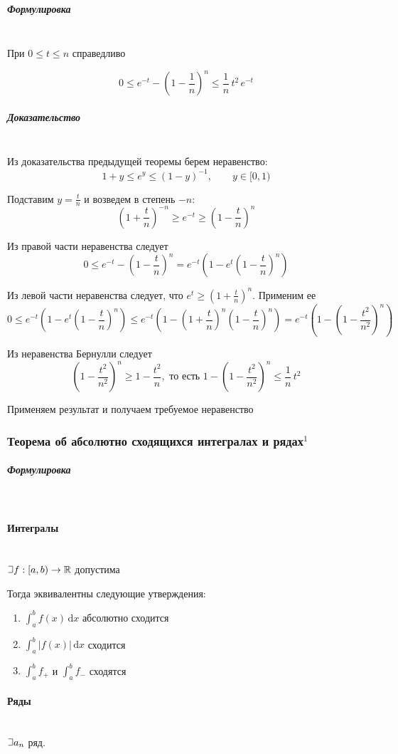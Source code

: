 \documentclass{article}
\def\letus{%
\mathord{\setbox0=\hbox{$\exists$}%
         \hbox{\kern 0.125\wd0%
               \vbox to \ht0{%
                  \hrule width 0.75\wd0%
                  \vfill%
                  \hrule width 0.75\wd0}%
               \vrule height \ht0%
               \kern 0.125\wd0}%
       }%
        }
\def\D{\,\mathrm{d}}
\let\vanillaparagraph\paragraph
\let\vanillasubparagraph\subparagraph
\renewcommand{\paragraph}[1]{\vanillaparagraph{#1}\mbox{}\\}
\renewcommand{\subparagraph}[1]{\vanillasubparagraph{#1}\mbox{}\\}
\begin{document}
\subparagraph{Формулировка}
При $0 \leq t \leq n$ справедливо

$$
0 \leq e^{-t} - \left(1 - \frac{1}{n}\right)^n \leq \frac{1}{n}\,t^2\,e^{-t}
$$
\subparagraph{Доказательство}

Из доказательства предыдущей теоремы берем неравенство:
$$
1 + y \leq e^y \leq (1-y)^{-1}, \qquad y \in [0, 1)
$$

Подставим $y = \frac{t}{n}$ и возведем в степень $-n$: 
$$
\left(1 + \frac{t}{n}\right)^{-n} \geq e^{-t} \geq \left(1 - \frac{t}{n}\right)^n
$$

Из правой части неравенства следует
$$
0 \leq e^{-t} - \left(1 - \frac{t}{n}\right)^n = e^{-t}\left(1 - e^t\left(1 - \frac{t}{n}\right)^n\right)
$$

Из левой части неравенства следует, что $e^t \geq \left(1 + \frac{t}{n}\right)^n$. Применим ее
$$
0 \leq e^{-t} \left(1 - e^t \left(1 - \frac{t}{n}\right)^n\right) \leq e^{-t} \left(1 - \left(1 + \frac{t}{n}\right)^n \left(1 - \frac{t}{n}\right)^n\right) = e^{-t}\left(1 - \left(1 - \frac{t^2}{n^2}\right)^n\right)
$$

Из неравенства Бернулли следует
$$
\left(1 - \frac{t^2}{n^2}\right)^n \geq 1 - \frac{t^2}{n}, \text{ то есть } 1 - \left(1 - \frac{t^2}{n^2}\right)^n \leq \frac{1}{n}\,t^2
$$

Применяем результат и получаем требуемое неравенство

\subsubsection{Теорема об абсолютно сходящихся интегралах и рядах\texorpdfstring{$^1$}{}}
\subparagraph{Формулировка}
\paragraph{Интегралы}
$\letus f: [a, b) \rightarrow \mathbb{R}$ допустима

Тогда эквивалентны следующие утверждения:
\begin{enumerate}
    \item $\int_a^b f(x) \D x$ абсолютно сходится
    \item $\int_a^b |f(x)| \D x$ сходится
    \item $\int_a^b f_+$ и $\int_a^b f_-$ сходятся
\end{enumerate}

\paragraph{Ряды}
$\letus a_n$ ряд.
\end{document}
